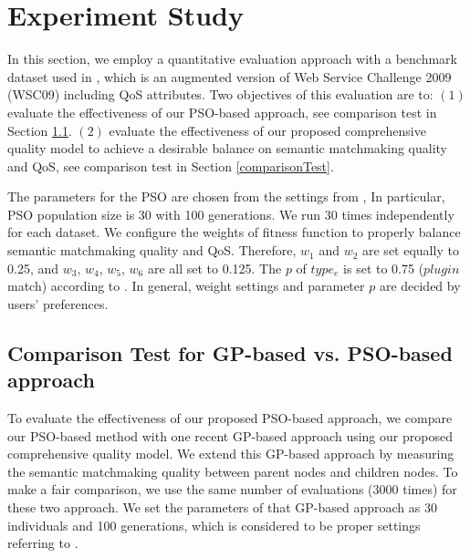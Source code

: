\documentclass{llncs}
\begin{document}
\section{Experiment Study}\label{experiment_design}
In this section, we employ a quantitative evaluation approach with a benchmark dataset used in \cite{ma2015hybrid,da2016genetic}, which is an augmented version of Web Service Challenge 2009 (WSC09) including QoS attributes. Two objectives of this evaluation are to: $(1)$ evaluate the effectiveness of our PSO-based approach, see comparison test in Section \ref{comparisonTestWithGP}.
$(2)$ evaluate the effectiveness of our proposed comprehensive quality model to achieve a desirable balance on semantic matchmaking quality and QoS, see comparison test in Section \ref{comparisonTest}.



The parameters for the PSO are chosen from the settings from \cite{shi2001particle}, In particular, PSO population size is 30 with 100 generations. We run 30 times independently for each dataset. We configure the weights of fitness function to properly balance semantic matchmaking quality and QoS. Therefore, $w_{1}$ and $w_{2}$ are set equally to 0.25, and $w_{3}$, $w_{4}$, $w_{5}$, $w_{6}$ are all set to 0.125. The $p$ of $type_e$ is set to 0.75 ($plugin$ match) according to \cite{lecue2009optimizing}. In general, weight settings and parameter $p$ are decided by users' preferences.
\vspace{-0.5cm}
\subsection{Comparison Test for GP-based vs. PSO-based approach}\label{comparisonTestWithGP}
To evaluate the effectiveness of our proposed PSO-based approach, we compare our PSO-based method with one recent GP-based approach \cite{ma2015hybrid} using our proposed comprehensive quality model. We extend this GP-based approach by measuring the semantic matchmaking quality between parent nodes and children nodes. To make a fair comparison, we use the same number of evaluations (3000 times) for these two approach. We set the parameters of that GP-based approach as 30 individuals and 100 generations, which is considered to be proper settings referring to \cite{da2015gp}.
\end{document}
